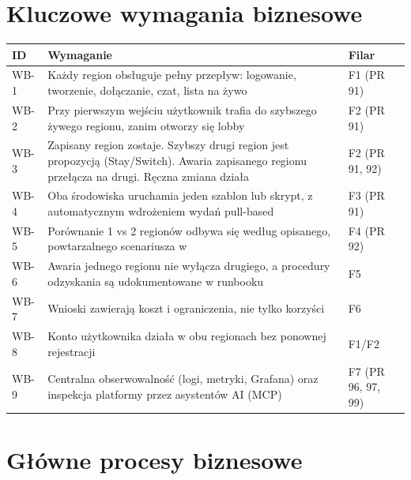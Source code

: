 \documentclass[12pt,a4paper]{article}
\newcommand{\code}[1]{\texttt{\detokenize{#1}}}
\begin{document}
\section{Kluczowe wymagania biznesowe}
\begin{table}[H]
\centering\small
\begin{tabularx}{\textwidth}{@{}lYl@{}}
\toprule
\textbf{ID} & \textbf{Wymaganie} & \textbf{Filar} \\
\midrule
WB-1 & Każdy region obsługuje pełny przepływ: logowanie, tworzenie, dołączanie, czat, lista na żywo & F1 (PR 91) \\
WB-2 & Przy pierwszym wejściu użytkownik trafia do szybszego żywego regionu, zanim otworzy się lobby & F2 (PR 91) \\
WB-3 & Zapisany region zostaje. Szybszy drugi region jest propozycją (Stay/Switch). Awaria zapisanego regionu przełącza na drugi. Ręczna zmiana działa & F2 (PR 91, 92) \\
WB-4 & Oba środowiska uruchamia jeden szablon lub skrypt, z automatycznym wdrożeniem wydań pull-based & F3 (PR 91) \\
WB-5 & Porównanie 1 vs 2 regionów odbywa się według opisanego, powtarzalnego scenariusza w \code{experiments/f4/} & F4 (PR 92) \\
WB-6 & Awaria jednego regionu nie wyłącza drugiego, a procedury odzyskania są udokumentowane w runbooku & F5 \\
WB-7 & Wnioski zawierają koszt i ograniczenia, nie tylko korzyści & F6 \\
WB-8 & Konto użytkownika działa w obu regionach bez ponownej rejestracji & F1/F2 \\
WB-9 & Centralna obserwowalność (logi, metryki, Grafana) oraz inspekcja platformy przez asystentów AI (MCP) & F7 (PR 96, 97, 99) \\
\bottomrule
\end{tabularx}
\end{table}

\section{Główne procesy biznesowe}
\end{document}

